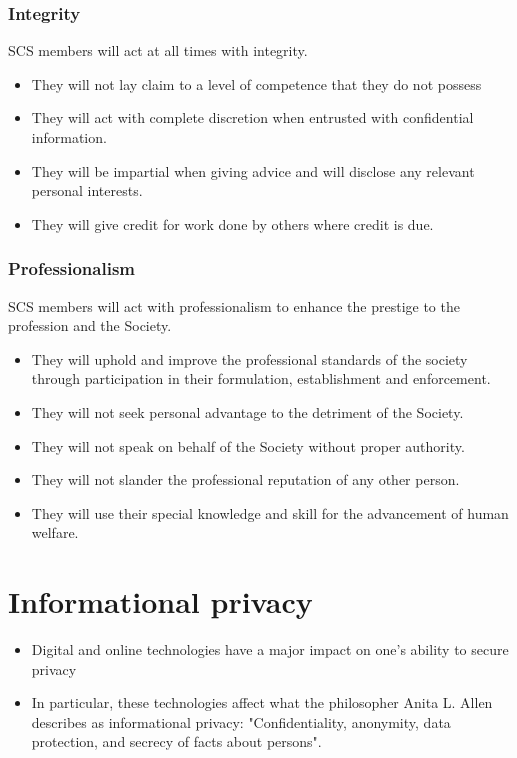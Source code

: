 \documentclass[11pt]{article}
\begin{document}
\subsubsection{Integrity}
\label{sec:orgca10762}
SCS members will act at all times with integrity.
\begin{itemize}
\item They will not lay claim to a level of competence that they do not possess
\item They will act with complete discretion when entrusted with confidential information.
\item They will be impartial when giving advice and will disclose any relevant personal interests.
\item They will give credit for work done by others where credit is due.
\end{itemize}
\subsubsection{Professionalism}
\label{sec:orgd4e54fb}
SCS members will act with professionalism to enhance the prestige to the profession and the Society.
\begin{itemize}
\item They will uphold and improve the professional standards of the society through participation in their formulation, establishment and enforcement.
\item They will not seek personal advantage to the detriment of the Society.
\item They will not speak on behalf of the Society without proper authority.
\item They will not slander the professional reputation of any other person.
\item They will use their special knowledge and skill for the advancement of human welfare.
\end{itemize}
\section{Informational privacy}
\label{sec:org6ec07f5}
\begin{itemize}
\item Digital and online technologies have a major impact on one's ability to secure privacy
\item In particular, these technologies affect what the philosopher Anita L. Allen describes as informational privacy: "Confidentiality, anonymity, data protection, and secrecy of facts about persons".
\end{itemize}
\end{document}
